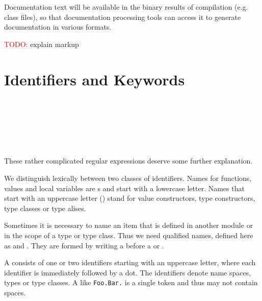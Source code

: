 Documentation text will be available in the binary results of compilation (e.g. \java{} class files), so that documentation processing tools can access it to generate documentation in various formats.

\textcolor{red}{\large TODO:} explain markup

\section{Identifiers and Keywords}  \label {qualified names}

\begin{flushleft}

\\

 \\

 \\

   \oder{} \\
   \oder{} \\
\end{flushleft}

These rather complicated regular expressions deserve some further
explanation.

We distinguish lexically between two classes of identifiers.
Names for functions, values and local variables are s
and start with a lowercase letter.
Names that start with an uppercase letter ()
stand for value constructors,
type constructors, type classes or type alises.

Sometimes it is necessary to name an item that is defined in another
module or in the scope of a type or type class. Thus we need qualified
names, defined here as  and . They are formed
by writing a  before a  or .

A  consists of one or two identifiers starting
with an uppercase letter, where each identifier is immediately
followed by a dot. The identifiers denote name spaces, types or type
classes. A  like \texttt{Foo.Bar.} is a single
token and thus may not contain spaces.


